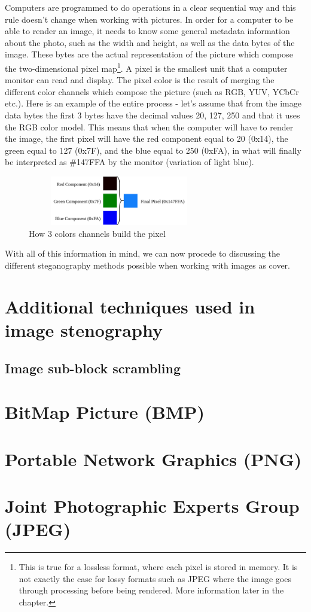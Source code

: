 \begin{multicols*}{2}
Computers are programmed to do operations in a clear sequential way and this rule doesn't change when working with pictures. In order for a computer to be able to render an image, it needs to know some general metadata information about the photo, such as the width and height, as well as the data bytes of the image. These bytes are the actual representation of the picture which compose the two-dimensional pixel map\footnote{This is true for a lossless format, where each pixel is stored in memory. It is not exactly the case for lossy formats such as JPEG where the image goes through processing before being rendered. More information later in the chapter.}. A pixel is the smallest unit that a computer monitor can read and display. The pixel color is the result of merging the different color channels which compose the picture (such as RGB, YUV, YCbCr etc.). Here is an example of the entire process - let's assume that from the image data bytes the first 3 bytes have the decimal values 20, 127, 250 and that it uses the RGB color model. This means that when the computer will have to render the image, the first pixel will have the red component equal to 20 (0x14), the green equal to 127 (0x7F), and the blue equal to 250 (0xFA), in what will finally be interpreted as \#147FFA by the monitor (variation of light blue). 

\begin{figure}[H]
    \centering
    \includegraphics[width=8cm,height=2.15cm,keepaspectratio]{pics/how_a_pixel_works}
    \caption{How 3 colors channels build the pixel}
    \label{Pixel Creation}
\end{figure}

With all of this information in mind, we can now procede to discussing the different steganography methods possible when working with images as cover.

\end{multicols*}

\section{Additional techniques used in image stenography}
\subsection{Image sub-block scrambling}

\section{BitMap Picture (BMP)}

\section{Portable Network Graphics (PNG)}

\section{Joint Photographic Experts Group (JPEG)}
